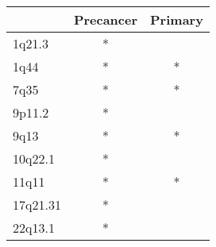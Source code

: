 \begin{tabular}{lcc}
\toprule
{} & Precancer & Primary \\
\midrule
1q21.3   &         * &         \\
1q44     &         * &       * \\
7q35     &         * &       * \\
9p11.2   &         * &         \\
9q13     &         * &       * \\
10q22.1  &         * &         \\
11q11    &         * &       * \\
17q21.31 &         * &         \\
22q13.1  &         * &         \\
\bottomrule
\end{tabular}
